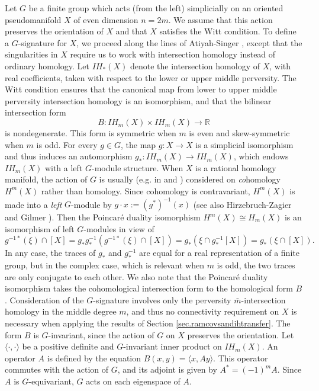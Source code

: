 \documentclass{amsart}
\theoremstyle{definition}
\theoremstyle{remark}
\newcommand {\real}  {\ensuremath{\mathbb{R}}}
\newcommand {\bm}    {{\ensuremath{\bar{m}}}}
\begin{document}
Let $G$ be a finite group which acts (from the left)
simplicially on an oriented pseudomanifold $X$
of even dimension $n=2m$. We assume that this action preserves the
orientation of $X$ and that $X$ satisfies the Witt condition.
To define a $G$-signature for $X$, we proceed along the lines of
Atiyah-Singer \cite[\S 6]{atiyahsinger}, except that
the singularities in $X$ require us to work with intersection homology instead of
ordinary homology.
Let $IH_* (X)$ denote the intersection homology of $X$, with real coefficients, taken
with respect to the lower or upper middle perversity. The Witt condition ensures
that the canonical map from lower to upper middle perversity intersection 
homology is an isomorphism, and that the bilinear intersection form
\[ B: IH_m (X) \times IH_m (X) \longrightarrow \real \]
is nondegenerate. This form is symmetric when $m$ is even and
skew-symmetric when $m$ is odd.
For every $g\in G$,
the map $g: X\to X$ is a simplicial isomorphism and thus
induces an automorphism $g_*: IH_m (X)\to IH_m (X)$, which
endows $IH_m (X)$ with a left $G$-module structure.
When $X$ is a rational homology manifold,
the action of $G$ is usually
(e.g. in \cite{atiyahsinger} and \cite{zagier}) 
considered on \emph{co}homology $H^m (X)$ rather than homology.
Since cohomology is contravariant, $H^m (X)$ is made into a \emph{left} 
$G$-module by $g\cdot x := (g^*)^{-1} (x)$
(see also Hirzebruch-Zagier \cite[p. 30]{hirzebruchzagier} 
and Gilmer \cite[p. 106]{gilmer}).
Then the Poincar\'e duality isomorphism $H^m (X) \cong H_m (X)$
is an isomorphism of left $G$-modules in view of
\[ 
 g^{-1*} (\xi) \cap [X]
= g_* g^{-1}_* (g^{-1*} (\xi) \cap [X])
= g_* (\xi \cap g^{-1}_* [X])
= g_* (\xi \cap [X]).
\]
In any case, the traces of $g_*$ and $g^{-1}_*$ are equal for a real representation
of a finite group, but in the complex case, which is relevant when $m$ is odd, the
two traces are only conjugate to each other.
We also note that the Poincar\'e duality isomorphism takes the cohomological
intersection form to the homological form $B$.
Consideration of the $G$-signature involves only the perversity $\bm$-intersection
homology in the middle degree $m$, and thus no connectivity requirement
on $X$ is necessary when applying the results of 
Section \ref{sec.ramcovsandihtransfer}.
The form $B$ is $G$-invariant, since the action of $G$ on $X$ preserves the orientation.
Let $\langle \cdot, \cdot \rangle$ be a positive definite and $G$-invariant 
inner product on $IH_m (X)$.
An operator $A$ is defined by the equation 
$B(x,y) = \langle x, Ay  \rangle$.
This operator commutes with the action of $G$, and
its adjoint is given by $A^* = (-1)^m A$.
Since $A$ is $G$-equivariant, $G$ acts on each eigenspace of $A$.
\end{document}
